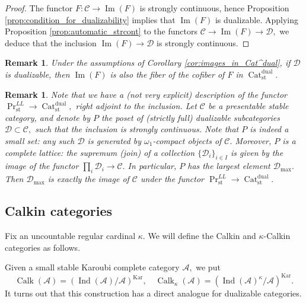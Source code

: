 \documentclass[11pt,leqno]{amsart}
\newtheorem{remark}[theo]{Remark}
\numberwithin{equation}{section}
\newcommand{\Cat}{\operatorname{Cat}}
\newcommand{\cont}{\operatorname{cont}}
\newcommand{\st}{\operatorname{st}}
\newcommand{\dual}{\operatorname{dual}}
\newcommand{\cD}{{\mathcal D}}
\newcommand{\cA}{{\mathcal A}}
\newcommand{\cC}{{\mathcal C}}
\newcommand{\cY}{{\mathcal Y}}
\newcommand{\Kar}{\operatorname{Kar}}
\newcommand{\im}{\operatorname{Im}}
\newcommand{\Ind}{\operatorname{Ind}}
\newcommand{\Calk}{\operatorname{Calk}}
\begin{document}
\begin{proof}The functor $F:\cC\to \im(F)$ is strongly continuous, hence Proposition \ref{prop:condition_for_dualizability} implies that $\im(F)$ is dualizable. Applying Proposition \ref{prop:automatic_strcont} to the functors $\cC\to\im(F)\to\cD,$ we deduce that the inclusion $\im(F)\to\cD$ is strongly continuous.\end{proof}

\begin{remark}Under the assumptions of Corollary \ref{cor:images_in_Cat^dual}, if $\cD$ is dualizable, then $\im(F)$ is also the fiber of the cofiber of $F$ in $\Cat_{\st}^{\dual}.$\end{remark}

\begin{remark}Note that we have a (not very explicit) description of the functor $\Pr^{LL}_{\st}\to\Cat_{\st}^{\dual},$ right adjoint to the inclusion. Let $\cC$ be a presentable stable category, and denote by $P$ the poset of (strictly full) dualizable subcategories $\cD\subset\cC,$ such that the inclusion is strongly continuous. Note that $P$ is indeed a small set: any such $\cD$ is generated by $\omega_1$-compact objects of $\cC.$ Moreover, $P$ is a complete lattice: the supremum (join) of a collection $\{\cD_i\}_{i\in I}$ is given by the image of the functor $\prod_i\cD_i\to\cC.$ In particular, $P$ has the largest element $\cD_{\max}.$ Then $\cD_{\max}$ is exactly the image of $\cC$ under the functor $\Pr^{LL}_{\st}\to\Cat_{\st}^{\dual}.$\end{remark}

\subsection{Calkin categories}
\label{ssec:Calkin}

Fix an uncountable regular cardinal $\kappa.$ We will define the Calkin and $\kappa$-Calkin categories as follows.

Given a small stable Karoubi complete category $\cA,$ we put $$\Calk(\cA)=(\Ind(\cA)/\cA)^{\Kar},\quad\Calk_{\kappa}(\cA)=(\Ind(\cA)^{\kappa}/\cA)^{\Kar}.$$
It turns out that this construction has a direct analogue for dualizable categories.
\end{document}
